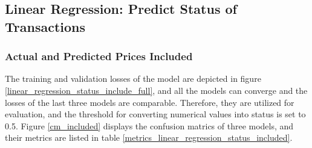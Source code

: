 \documentclass[12pt,twoside]{report}
\begin{document}
\subsection{Linear Regression: Predict Status of Transactions}
\subsubsection{Actual and Predicted Prices Included}
The training and validation losses of the model are depicted in figure \ref{linear_regression_status_include_full}, and all the models can converge and the losses of the last three models are comparable. Therefore, they are utilized for evaluation, and the threshold for converting numerical values into status is set to 0.5. Figure \ref{cm_included} displays the confusion matrics of three models, and their metrics are listed in table \ref{metrics_linear_regression_status_included}.
\\
\end{document}
